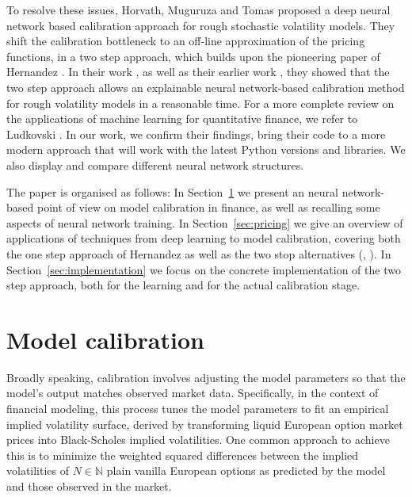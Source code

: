\documentclass{article}
\theoremstyle{remark}
\begin{document}
To resolve these issues, Horvath, Muguruza and Tomas \cite{HMM19} proposed a deep neural network based calibration approach for rough stochastic volatility models.
They shift the calibration bottleneck to an off-line approximation of the pricing functions, in a two step approach,
which builds upon the pioneering paper of Hernandez \cite{Hernandez}.
In their work \cite{HMM19}, as well as their earlier work \cite{BHMST19}, they showed that the two step approach
allows an explainable neural network-based calibration method for rough volatility models in a reasonable time.
For a more complete review on the applications of machine learning for quantitative finance, we refer to Ludkovski \cite{Ludkovski}.
In our work, we confirm their findings, bring their code to a more modern approach that will work with the latest Python versions and libraries.
We also display and compare different neural network structures.


The paper is organised as follows:
In Section~\ref{sec:model-calibration} we present an neural network-based point of view on model calibration in finance,
as well as recalling some aspects of neural network training.
In Section~\ref{sec:pricing} we give an overview of applications of techniques from deep learning to model calibration,
covering both the one step approach of Hernandez \cite{Hernandez} as well as the two stop alternatives (\cite{HMM19}, \cite{BHMST19}).
In Section~\ref{sec:implementation} we focus on the concrete implementation of the two step approach,
both for the learning and for the actual calibration stage.

\section{Model calibration}
\label{sec:model-calibration}

Broadly speaking, calibration involves adjusting the model parameters so that the model's output matches 
observed market data.
Specifically, in the context of financial modeling, this process tunes the model parameters to fit an empirical implied volatility surface,
derived by transforming liquid European option market prices into Black-Scholes implied volatilities.
One common approach to achieve this is to minimize the weighted squared differences between the
implied volatilities of $N \in \mathbb{N}$ plain vanilla European options as predicted by the model and those observed in the market.
\end{document}
